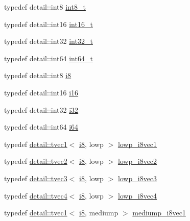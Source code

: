 \begin{DoxyCompactItemize}
\item 
typedef detail\+::int8 \hyperlink{group__gtc__type__precision_ga673898d450b2a91186f3c4f40c5f8633}{int8\+\_\+t}
\item 
typedef detail\+::int16 \hyperlink{group__gtc__type__precision_gaf89ee61e0d34aa4a462104b7ae7f2da6}{int16\+\_\+t}
\item 
typedef detail\+::int32 \hyperlink{group__gtc__type__precision_gab870c0eb6f525b0c8c4716762e0fc3a8}{int32\+\_\+t}
\item 
typedef detail\+::int64 \hyperlink{group__gtc__type__precision_ga6abb23fbf4e39c50ec5341160b5da5ab}{int64\+\_\+t}
\item 
typedef detail\+::int8 \hyperlink{group__gtc__type__precision_gaae064be68b7d36cd7910c16e8ad18bba}{i8}
\item 
typedef detail\+::int16 \hyperlink{group__gtc__type__precision_ga35e5542ca05b29cc256fdafb8503d1fd}{i16}
\item 
typedef detail\+::int32 \hyperlink{group__gtc__type__precision_ga1d8ed5c43e91ea7d4528389da4fa9524}{i32}
\item 
typedef detail\+::int64 \hyperlink{group__gtc__type__precision_gac7a7eaad46064fc952b06df33689da23}{i64}
\item 
typedef \hyperlink{structglm_1_1detail_1_1tvec1}{detail\+::tvec1}$<$ \hyperlink{group__gtc__type__precision_gaae064be68b7d36cd7910c16e8ad18bba}{i8}, lowp $>$ \hyperlink{group__gtc__type__precision_ga490ff77964d0386c1db936eb2a324988}{lowp\+\_\+i8vec1}
\item 
typedef \hyperlink{structglm_1_1detail_1_1tvec2}{detail\+::tvec2}$<$ \hyperlink{group__gtc__type__precision_gaae064be68b7d36cd7910c16e8ad18bba}{i8}, lowp $>$ \hyperlink{group__gtc__type__precision_ga511280c8869c7c79bba3c359f37f5559}{lowp\+\_\+i8vec2}
\item 
typedef \hyperlink{structglm_1_1detail_1_1tvec3}{detail\+::tvec3}$<$ \hyperlink{group__gtc__type__precision_gaae064be68b7d36cd7910c16e8ad18bba}{i8}, lowp $>$ \hyperlink{group__gtc__type__precision_ga048811f03c327d4b56564a72d98800e8}{lowp\+\_\+i8vec3}
\item 
typedef \hyperlink{structglm_1_1detail_1_1tvec4}{detail\+::tvec4}$<$ \hyperlink{group__gtc__type__precision_gaae064be68b7d36cd7910c16e8ad18bba}{i8}, lowp $>$ \hyperlink{group__gtc__type__precision_ga095202095a1fefbdae4a974c3b750223}{lowp\+\_\+i8vec4}
\item 
typedef \hyperlink{structglm_1_1detail_1_1tvec1}{detail\+::tvec1}$<$ \hyperlink{group__gtc__type__precision_gaae064be68b7d36cd7910c16e8ad18bba}{i8}, mediump $>$ \hyperlink{group__gtc__type__precision_ga820f8b497e06d518968d00761747c547}{mediump\+\_\+i8vec1}

\end{DoxyCompactItemize}
